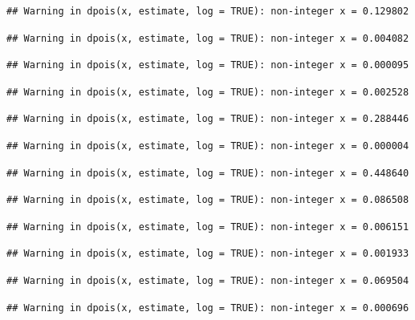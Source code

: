 \documentclass[]{article}
\begin{document}
\begin{verbatim}
## Warning in dpois(x, estimate, log = TRUE): non-integer x = 0.129802
\end{verbatim}

\begin{verbatim}
## Warning in dpois(x, estimate, log = TRUE): non-integer x = 0.004082
\end{verbatim}

\begin{verbatim}
## Warning in dpois(x, estimate, log = TRUE): non-integer x = 0.000095
\end{verbatim}

\begin{verbatim}
## Warning in dpois(x, estimate, log = TRUE): non-integer x = 0.002528
\end{verbatim}

\begin{verbatim}
## Warning in dpois(x, estimate, log = TRUE): non-integer x = 0.288446
\end{verbatim}

\begin{verbatim}
## Warning in dpois(x, estimate, log = TRUE): non-integer x = 0.000004
\end{verbatim}

\begin{verbatim}
## Warning in dpois(x, estimate, log = TRUE): non-integer x = 0.448640
\end{verbatim}

\begin{verbatim}
## Warning in dpois(x, estimate, log = TRUE): non-integer x = 0.086508
\end{verbatim}

\begin{verbatim}
## Warning in dpois(x, estimate, log = TRUE): non-integer x = 0.006151
\end{verbatim}

\begin{verbatim}
## Warning in dpois(x, estimate, log = TRUE): non-integer x = 0.001933
\end{verbatim}

\begin{verbatim}
## Warning in dpois(x, estimate, log = TRUE): non-integer x = 0.069504
\end{verbatim}

\begin{verbatim}
## Warning in dpois(x, estimate, log = TRUE): non-integer x = 0.000696
\end{verbatim}
\end{document}
